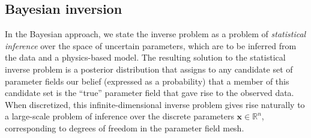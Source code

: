 \documentclass[11pt,final]{article}%
\renewcommand{\vec}[1] {\ensuremath{\boldsymbol{#1}}}
\begin{document}
\subsection{Bayesian inversion}\label{sec:bayesian}

In the Bayesian approach, we state the inverse problem as a problem of
\emph{statistical inference} over the space of uncertain parameters,
which are to be inferred from the data and a physics-based model.
The resulting solution to the statistical inverse problem is a
posterior distribution that assigns to any candidate set of parameter
fields our belief (expressed as a probability) that a member of this
candidate set is the ``true'' parameter field that gave rise to the
observed data.
%
When discretized, this  infinite-dimensional inverse problem  gives
rise naturally to a large-scale problem of inference over the discrete
parameters
$\vec{x} \in \mathbb R^n$, corresponding to degrees of
freedom in the parameter field mesh.

\end{document}
